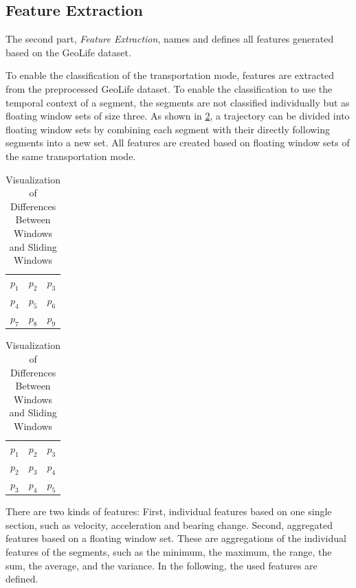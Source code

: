 \subsection{Feature Extraction}
The second part, \textit{Feature Extraction}, names and defines all features generated based on the GeoLife dataset.

To enable the classification of the transportation mode, features are extracted from the preprocessed GeoLife dataset. To enable the classification to use the temporal context of a segment, the segments are not classified individually but as floating window sets of size three. As shown in \ref{table:comp_windows}, a trajectory can be divided into floating window sets by combining each segment with their directly following segments into a new set. All features are created based on floating window sets of the same transportation mode. \cite{Bolbol2012}

\begin{table}[!htb]

    \begin{minipage}{.5\linewidth}
        \centering
        \begin{tabular}{|c c c|} 
        \toprule
        \rowcolor{white} $p_1$ & $p_2$ & $p_3$  \\
        $p_4$ & $p_5$ & $p_6$  \\
        \rowcolor{white} $p_7$ & $p_8$ & $p_9$  \\
        \bottomrule
        \end{tabular}
        \caption*{\small Windows of a trajectory}
    \end{minipage}%
    \begin{minipage}{.5\linewidth}
      \centering
        \begin{tabular}{|c c c|} 
        \toprule
        \rowcolor{white} $p_1$ & $p_2$ & $p_3$  \\
        $p_2$ & $p_3$ & $p_4$  \\
        \rowcolor{white} $p_3$ & $p_4$ & $p_5$  \\
        \bottomrule
        \end{tabular}
    \caption*{\small Sliding windows of a trajectory}
    \end{minipage} 
    
    \caption{Visualization of Differences Between Windows and Sliding Windows}
    \label{table:comp_windows}
\end{table}

There are two kinds of features: First, individual features based on one single section, such as velocity, acceleration and bearing change. Second, aggregated features based on a floating window set. These are aggregations of the individual features of the segments, such as the minimum, the maximum, the range, the sum, the average, and the variance. In the following, the used features are defined.


